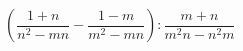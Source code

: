 \begin{ex}[type=simplify_calculate]
	\begin{condition}
		\(\left( \dfrac{1+n}{n^2-mn}-\dfrac{1-m}{m^2-mn} \right):\dfrac{m+n}{m^2n-n^2m}\)
	\end{condition}
\end{ex}